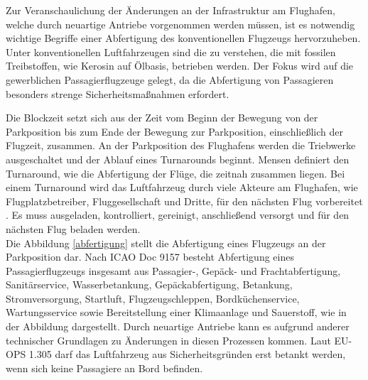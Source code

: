 Zur Veranschaulichung der Änderungen an der Infrastruktur am Flughafen, 
welche durch neuartige Antriebe vorgenommen werden müssen, ist es notwendig 
wichtige Begriffe einer Abfertigung des konventionellen Flugzeugs hervorzuheben. 
Unter konventionellen Luftfahrzeugen sind die zu verstehen,
die mit fossilen Treibstoffen, wie Kerosin auf Ölbasis, betrieben werden. 
Der Fokus wird auf die gewerblichen Passagierflugzeuge gelegt,
da die Abfertigung von Passagieren besonders strenge Sicherheitsmaßnahmen erfordert. %

Die Blockzeit setzt sich aus der Zeit vom Beginn der Bewegung von der Parkposition 
bis zum Ende der Bewegung zur Parkposition, einschließlich der Flugzeit, zusammen.
An der Parkposition des Flughafens werden die Triebwerke ausgeschaltet 
und der Ablauf eines Turnarounds beginnt. 
Mensen \cite{mensen2013handbuch} definiert den Turnaround, 
wie die Abfertigung der Flüge, die zeitnah zusammen liegen. %
Bei einem Turnaround wird das Luftfahrzeug durch viele Akteure am Flughafen, 
wie Flugplatzbetreiber, Fluggesellschaft und Dritte, für den nächsten Flug vorbereitet \cite{mensen2013handbuch}. 
Es muss ausgeladen, kontrolliert, gereinigt, anschließend versorgt 
und für den nächsten Flug beladen werden.\\

Die Abbildung \ref{abfertigung} stellt die Abfertigung eines Flugzeugs an der Parkposition dar.
Nach ICAO Doc 9157 besteht Abfertigung eines Passagierflugzeugs 
insgesamt aus Passagier-, Gepäck- und Frachtabfertigung, Sanitärservice, Wasserbetankung, 
Gepäckabfertigung, Betankung, Stromversorgung, Startluft, Flugzeugschleppen, 
Bordküchenservice, Wartungsservice sowie Bereitstellung einer Klimaanlage und Sauerstoff,
wie in der Abbildung dargestellt. Durch neuartige Antriebe kann es aufgrund anderer 
technischer Grundlagen zu Änderungen in diesen Prozessen kommen.
Laut EU-OPS 1.305 darf das Luftfahrzeug aus Sicherheitsgründen erst betankt werden, 
wenn sich keine Passagiere an Bord befinden. 
%

